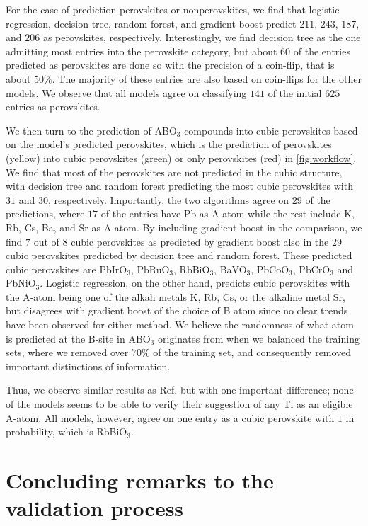 \noindent For the case of prediction perovskites or nonperovskites, we find that logistic regression, decision tree, random forest, and gradient boost predict $211$, $243$, $187$, and $206$ as perovskites, respectively. Interestingly, we find decision tree as the one admitting most entries into the perovskite category, but about $60$ of the entries predicted as perovskites are done so with the precision of a coin-flip, that is about $50\%$. The majority of these entries are also based on coin-flips for the other models. We observe that all models agree on classifying $141$ of the initial $625$ entries as perovskites.

We then turn to the prediction of ABO$_3$ compounds into cubic perovskites based on the model's predicted perovskites, which is the prediction of perovskites (yellow) into cubic perovskites (green) or only perovskites (red) in \autoref{fig:workflow}. We find that most of the perovskites are not predicted in the cubic structure, with decision tree and random forest predicting the most cubic perovskites with $31$ and $30$, respectively. Importantly, the two algorithms agree on $29$ of the predictions, where $17$ of the entries have Pb as A-atom while the rest include K, Rb, Cs, Ba, and Sr as A-atom. By including gradient boost in the comparison, we find $7$ out of $8$ cubic perovskites as predicted by gradient boost also in the $29$ cubic perovskites predicted by decision tree and random forest. These predicted cubic perovskites are PbIrO$_3$, PbRuO$_3$, RbBiO$_3$, BaVO$_3$, PbCoO$_3$, PbCrO$_3$ and PbNiO$_3$. Logistic regression, on the other hand, predicts cubic perovskites with the A-atom being one of the alkali metals K, Rb, Cs, or the alkaline metal Sr, but disagrees with gradient boost of the choice of B atom since no clear trends have been observed for either method. We believe the randomness of what atom is predicted at the B-site in ABO$_3$ originates from when we balanced the training sets, where we removed over $70\%$ of the training set, and consequently removed important distinctions of information.

Thus, we observe similar results as Ref. \cite{Balachandran2018} but with one important difference; none of the models seems to be able to verify their suggestion of any Tl as an eligible A-atom. All models, however, agree on one entry as a cubic perovskite with $1$ in probability, which is RbBiO$_3$.

\section{Concluding remarks to the validation process}

